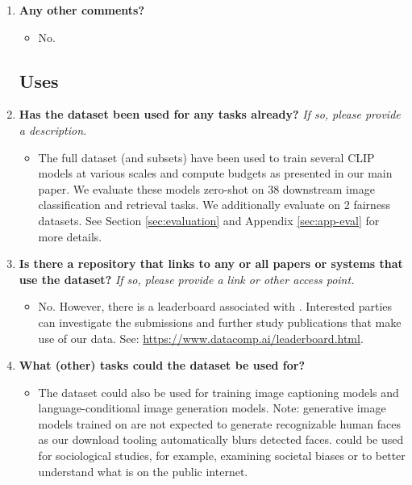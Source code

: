 \begin{enumerate}[label=Q\arabic*]
\item \textbf{Any other comments?}

\begin{itemize}
\item No.
\end{itemize}

\subsection{Uses}

\item \textbf{Has the dataset been used for any tasks already?} \textit{If so, please provide a description.}

\begin{itemize}
\item The full dataset (and subsets) have been used to train several CLIP models at various scales and compute budgets as presented in our main paper. We evaluate these models zero-shot on 38 downstream image classification and retrieval tasks. We additionally evaluate on 2 fairness datasets. See Section \ref{sec:evaluation} and Appendix \ref{sec:app-eval} for more details.
\end{itemize}

\item \textbf{Is there a repository that links to any or all papers or systems that use the dataset?} \textit{If so, please provide a link or other access point.}

\begin{itemize}
\item No. However, there is a leaderboard associated with \datanet. Interested parties can investigate the submissions and further study publications that make use of our data. See: \url{https://www.datacomp.ai/leaderboard.html}.
\end{itemize}

\item \textbf{What (other) tasks could the dataset be used for?}

\begin{itemize}
\item The dataset could also be used for training image captioning models and language-conditional image generation models. Note: generative image models trained on \pool are not expected to generate recognizable human faces as our download tooling automatically blurs detected faces. \pool could be used for sociological studies, for example, examining societal biases or to better understand what is on the public internet.
\end{itemize}


\end{enumerate}
